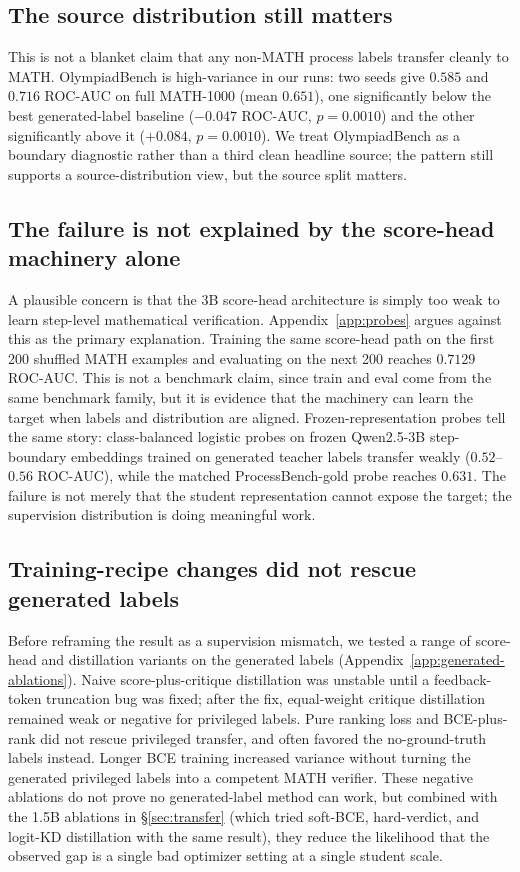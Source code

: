 \documentclass{article}
\begin{document}
\subsection{The source distribution still matters}
This is not a blanket claim that any non-MATH process labels transfer
cleanly to MATH. OlympiadBench is high-variance in our runs: two seeds give
$0.585$ and $0.716$ ROC-AUC on full MATH-1000 (mean $0.651$), one
significantly below the best generated-label baseline
($-0.047$ ROC-AUC, $p=0.0010$) and the other significantly above it
($+0.084$, $p=0.0010$). We treat OlympiadBench as a boundary diagnostic
rather than a third clean headline source; the pattern still supports a
source-distribution view, but the source split matters.

\subsection{The failure is not explained by the score-head machinery alone}
\label{sec:mismatch-probes}
A plausible concern is that the 3B score-head architecture is simply too
weak to learn step-level mathematical verification. Appendix~\ref{app:probes}
argues against this as the primary explanation. Training the same score-head
path on the first 200 shuffled MATH examples and evaluating on the next 200
reaches $0.7129$ ROC-AUC. This is not a benchmark claim, since train and eval
come from the same benchmark family, but it is evidence that the machinery can
learn the target when labels and distribution are aligned. Frozen-representation
probes tell the same story: class-balanced logistic probes on frozen
Qwen2.5-3B step-boundary embeddings trained on generated teacher labels
transfer weakly ($0.52$--$0.56$ ROC-AUC), while the matched
ProcessBench-gold probe reaches $0.631$. The failure is not merely that the
student representation cannot expose the target; the supervision
distribution is doing meaningful work.

\subsection{Training-recipe changes did not rescue generated labels}
\label{sec:mismatch-ablations}
Before reframing the result as a supervision mismatch, we tested a range of
score-head and distillation variants on the generated labels
(Appendix~\ref{app:generated-ablations}). Naive score-plus-critique distillation
was unstable until a feedback-token truncation bug was fixed; after the fix,
equal-weight critique distillation remained weak or negative for privileged
labels. Pure ranking loss and BCE-plus-rank did not rescue privileged
transfer, and often favored the no-ground-truth labels instead. Longer BCE
training increased variance without turning the generated privileged labels
into a competent MATH verifier. These negative ablations do not prove no
generated-label method can work, but combined with the 1.5B ablations in
\S\ref{sec:transfer} (which tried soft-BCE, hard-verdict, and logit-KD
distillation with the same result), they reduce the likelihood that the
observed gap is a single bad optimizer setting at a single student scale.
\end{document}

